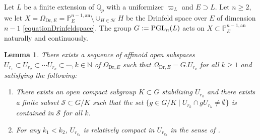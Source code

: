 \documentclass[a4paper,10pt]{amsart}
\theoremstyle{remark}
\theoremstyle{definition}
\theoremstyle{plain}
\newtheorem{lemma}[theorem]{Lemma}
\numberwithin{equation}{section}
\newcommand{\bbN}{{\mathbb N}}
\newcommand{\bbP}{{\mathbb P}}
\newcommand{\bbQ}{{\mathbb Q}}
\newcommand{\calH}{{\mathcal H}}
\newcommand{\calS}{{\mathcal S}}
\newcommand{\PGL}{{\rm PGL}}
\begin{document}
Let $L$ be a finite extension of $\bbQ_p$ with a uniformizer $\varpi_L$ and $E\supset L$. Let $n\geq 2$, we let $X=\Omega_{\mathrm{Dr},E}=\bbP_E^{n-1,\mathrm{an}}\setminus\cup_{H\in \calH}H$ be the Drinfeld space over $E$ of dimension $n-1$ \eqref{equationDrinfeldspace}. The group $G:=\PGL_n(L)$ acts on $X\subset \bbP_E^{n-1,\mathrm{an}}$ naturally and continuously.
\begin{lemma}\label{lemmasequenceaffinoid}
There exists a sequence of affinoid open subspaces $U_{r_1}\subset U_{r_2}\subset \cdots U_{r_k}\subset \cdots ,k\in\bbN$ of $\Omega_{\mathrm{Dr},E}$ such that $\Omega_{\mathrm{Dr},E}=G.U_{r_k}$ for all $k\geq 1$ and satisfying the following:
\begin{enumerate}
	\item There exists an open compact subgroup $K\subset G$ stabilizing $U_{r_k}$ and there exists a finite subset $\calS\subset G/K$ such that the set $\{g\in G/K\mid U_{r_k}\cap g U_{r_k}\neq \emptyset\}$ is contained in $ \calS$ for all $k$.
	\item For any $k_1<k_2$, $U_{r_{k_1}}$ is relatively compact in $U_{r_{k_2}}$ in the sense of \cite[\S~9.6.2]{BGR84}. 
\end{enumerate}	
\end{lemma}
\end{document}
